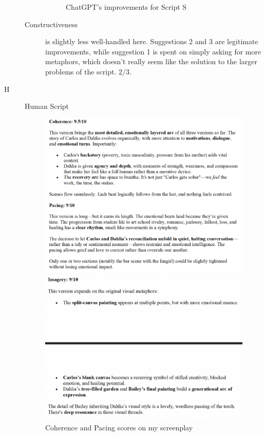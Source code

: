 \documentclass[sigconf]{acmart}
\begin{document}
\begin{description}
\begin{description}
\begin{figure}[!hbt]
            \caption{ChatGPT's improvements for Script S}
            \label{fig:s-improvements}
        \end{figure}
        \item[Constructiveness] is slightly less well-handled here. Suggestions 2 and 3 are legitimate improvements, while suggestion 1 is spent on simply asking for more metaphors, which doesn't really seem like the solution to the larger problems of the script. $2/3$.
    \end{description}
    \item[H] Human Script
    \begin{figure}[!hbt]
    \centering
    \begin{minipage}{0.2\textwidth}
        \includegraphics[width=1.0\linewidth]{images/HMetrics1.png}
        \caption{Coherence and Pacing scores on my screenplay}
        \label{fig:h-metrics-1}
    \end{minipage}\hfill
    \begin{minipage}{0.2\textwidth}
        \includegraphics[width=1.0\linewidth]{HMetrics2.png}

\end{minipage}
\end{figure}
\end{description}
\end{document}
